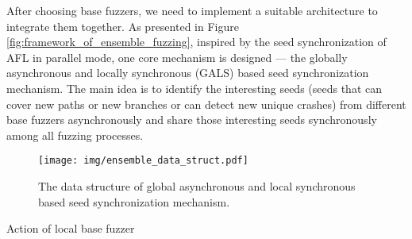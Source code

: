 
After choosing base fuzzers, we need to implement a suitable architecture to integrate them together. As presented in Figure \ref{fig:framework_of_ensemble_fuzzing}, 
inspired by the seed synchronization of AFL in parallel mode, 
one core mechanism is designed --- the globally asynchronous and locally synchronous (GALS) based seed synchronization mechanism. 
The main idea is to identify the interesting seeds (seeds that can cover new paths or new branches or can detect new unique crashes) from different base fuzzers asynchronously and share those interesting seeds synchronously among all fuzzing processes. %

\begin{figure}[!htb]
 \centering
 \texttt{[image: img/ensemble\_data\_struct.pdf]}
 \vspace{-1.5 cm}
 \caption{The data  structure of global asynchronous and local synchronous based seed synchronization mechanism.}
 \label{fig:ensemble_architecture}
\end{figure}

\IncMargin{1em}
\begin{algorithm}
\SetAlgoLined
{}




\caption{Action of local base fuzzer}\label{sync_baseFuzzer}
\end{algorithm}\DecMargin{1em}


